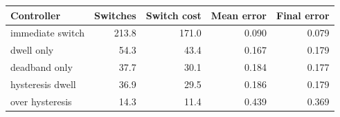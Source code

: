 \begin{tabular}{lrrrr}
\toprule
Controller & Switches & Switch cost & Mean error & Final error \\
\midrule
immediate switch & 213.8 & 171.0 & 0.090 & 0.079 \\
dwell only & 54.3 & 43.4 & 0.167 & 0.179 \\
deadband only & 37.7 & 30.1 & 0.184 & 0.177 \\
hysteresis dwell & 36.9 & 29.5 & 0.186 & 0.179 \\
over hysteresis & 14.3 & 11.4 & 0.439 & 0.369 \\
\bottomrule
\end{tabular}
